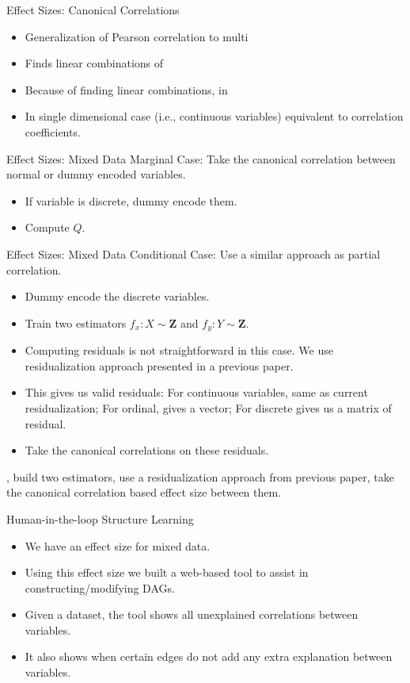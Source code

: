 \documentclass{beamer}
\begin{document}
\begin{frame}{Effect Sizes: Canonical Correlations}
	\begin{itemize}
		\item Generalization of Pearson correlation to multi
		\item Finds linear combinations of 
		\item Because of finding linear combinations, in
		\item In single dimensional case (i.e., continuous variables) equivalent to correlation coefficients.
	\end{itemize}
\end{frame}

\begin{frame}{Effect Sizes: Mixed Data}
	Marginal Case: Take the canonical correlation between normal or dummy encoded variables.
	\begin{itemize}
		\item If variable is discrete, dummy encode them.
		\item Compute $ Q $.
	\end{itemize}
\end{frame}

\begin{frame}{Effect Sizes: Mixed Data}
	Conditional Case: Use a similar approach as partial correlation.
	\begin{itemize}
		\item Dummy encode the discrete variables.
		\item Train two estimators $ f_x: X \sim \bm{Z} $ and $ f_y: Y \sim \bm{Z} $.
		\item Computing residuals is not straightforward in this case. We use residualization approach presented in a previous paper.
		\item This gives us valid residuals: For continuous variables, same as current residualization; For ordinal, gives a vector; For discrete gives us a matrix of residual.
		\item Take the canonical correlations on these residuals.
	\end{itemize}

	, build two 
		estimators, use a residualization approach from previous paper, take
		the canonical correlation based effect size between them.
\end{frame}

\begin{frame}{Human-in-the-loop Structure Learning}
	\begin{itemize}
		\item We have an effect size for mixed data.
		\item Using this effect size we built a web-based tool to assist in constructing/modifying DAGs.
		\item Given a dataset, the tool shows all unexplained correlations between variables.
		\item It also shows when certain edges do not add any extra explanation between variables.
	\end{itemize}
\end{frame}
\end{document}
